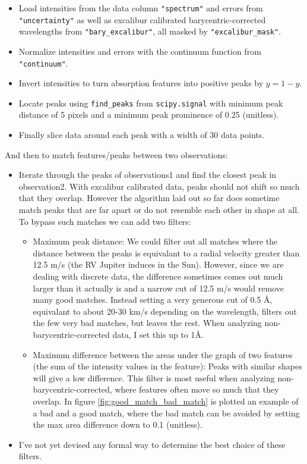    \begin{itemize}
        \item Load intensities from the data column \verb|"spectrum"| and errors from \verb|"uncertainty"| as well as excalibur calibrated barycentric-corrected wavelengths from \verb|"bary_excalibur"|, all masked by \verb|"excalibur_mask"|.
        \item Normalize intensities and errors with the continuum function from \verb|"continuum"|.
        \item Invert intensities to turn absorption features into positive peaks by $y = 1 - y$.
        \item Locate peaks using \verb|find_peaks| from \verb|scipy.signal| with minimum peak distance of 5 pixels and a minimum peak prominence of 0.25 (unitless).
        \item Finally slice data around each peak with a width of 30 data points. 
    \end{itemize}

    And then to match features/peaks between two observations:

    \begin{itemize}
        \item Iterate through the peaks of observations1 and find the closest peak in observation2. With excalibur calibrated data, peaks should not shift so much that they overlap. However the algorithm laid out so far does sometime match peaks that are far apart or do not resemble each other in shape at all. To bypass such matches we can add two filters:
        \begin{itemize}
            \item Maximum peak distance: We could filter out all matches where the distance between the peaks is equivalant to a radial velocity greater than 12.5 m/s (the RV Jupiter induces in the Sun). However, since we are dealing with discrete data, the difference sometimes comes out much larger than it actually is and a narrow cut of 12.5 m/s would remove many good matches. Instead setting a very generous cut of 0.5 Å, equivalant to about 20-30 km/s depending on the wavelength, filters out the few very bad matches, but leaves the rest. When analyzing non-barycentric-corrected data, I set this up to 1Å. 
            
            \item Maximum difference between the areas under the graph of two features (the sum of the intensity values in the feature): Peaks with similar shapes will give a low difference. This filter is most useful when analyzing non-barycentric-corrected, where features often move so much that they overlap. In figure \ref{fig:good_match_bad_match} is plotted an example of a bad and a good match, where the bad match can be avoided by setting the max area difference down to 0.1 (unitless). 
        \end{itemize}
        \item I've not yet devised any formal way to determine the best choice of these filters.
    \end{itemize}

